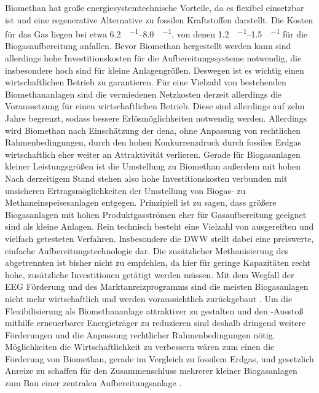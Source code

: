 Biomethan hat große energiesystemtechnische Vorteile, da es flexibel einsetzbar ist und eine regenerative Alternative zu fossilen Kraftstoffen darstellt. Die Kosten für das Gas liegen bei etwa \SIrange{6,2}{8,0}{\ct\per\kwh}, von denen \SIrange{1,2}{1,5}{\ct\per\kwh} für die Biogasaufbereitung anfallen. Bevor Biomethan hergestellt werden kann sind allerdings hohe Investitionskosten für die Aufbereitungssysteme notwendig, die insbesondere hoch sind für kleine Anlagengrößen. Deswegen ist es wichtig einen wirtschaftlichen Betrieb zu garantieren. Für eine Vielzahl von bestehenden Biomethananlagen sind die vermiedenen Netzkosten derzeit allerdings die Voraussetzung für einen wirtschaftlichen Betrieb. Diese sind allerdings auf zehn Jahre begrenzt, sodass bessere Erlösmöglichkeiten notwendig werden. Allerdings wird Biomethan nach Einschätzung der dena, ohne Anpassung von rechtlichen Rahmenbedingungen, durch den hohen Konkurrenzdruck durch fossiles Erdgas wirtschaftlich eher weiter an Attraktivität verlieren.  \parencite{dena2018} \newline
Gerade für Biogasanlagen kleiner Leistungsgrößen ist die Umstellung zu Biomethan außerdem mit hohen 
Nach derzeitigem Stand stehen also hohe Investitionskosten verbunden mit unsicheren Ertragsmöglichkeiten der Umstellung von Biogas- zu Methaneinspeisesanlagen entgegen. Prinzipiell ist zu sagen, dass größere Biogasanlagen mit hohen Produktgasströmen eher für Gasaufbereitung geeignet sind als kleine Anlagen. Rein technisch besteht eine Vielzahl von ausgereiften und vielfach getesteten Verfahren. Insbesondere die \gls{DWW} stellt dabei eine preiswerte, einfache Aufbereitungstechnologie dar. Die zusätzlicher Methanisierung des abgetrennten  ist bisher nicht zu empfehlen, da hier für geringe Kapazitäten recht hohe, zusätzliche Investitionen getätigt werden müssen. Mit dem Wegfall der \gls{EEG} Förderung und des Marktanreizprogramms sind die meisten Biogasanlagen nicht mehr wirtschaftlich und werden voraussichtlich zurückgebaut \parencite{UmBA19}. Um die Flexibilisierung als Biomethananlage attraktiver zu gestalten und den -Ausstoß mithilfe erneuerbarer Energieträger zu reduzieren sind deshalb dringend weitere Förderungen und die Anpassung rechtlicher Rahmenbedingungen nötig. Möglichkeiten die Wirtschaftlichkeit zu verbessern wären zum einen die Förderung von Biomethan, gerade im Vergleich zu fossilem Erdgas, und gesetzlich Anreize zu schaffen für den Zusammenschluss mehrerer kleiner Biogasanlagen zum Bau einer zentralen Aufbereitungsanlage \parencite{UmBA19}. 


